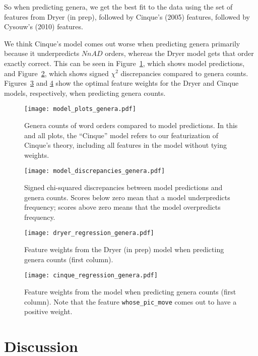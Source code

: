 \documentclass[11pt]{article}
\begin{document}
So when predicting genera, we get the best fit to the data using the set of features from Dryer (in prep), followed by Cinque's (2005) features, followed by Cysouw's (2010) features.

We think Cinque's model comes out worse when predicting genera primarily because it underpredicts $NnAD$ orders, whereas the Dryer model gets that order exactly correct. This can be seen in Figure~\ref{fig:genera-predictions}, which shows model predictions, and Figure~\ref{fig:genera-discrepancies}, which shows signed $\chi^2$ discrepancies compared to genera counts.
Figures~\ref{fig:dryer-model-genera} and \ref{fig:cinque-model-genera} show the optimal feature weights for the Dryer and Cinque models, respectively, when predicting genera counts.

\begin{figure}[ht!]
  \centering
  \texttt{[image: model\_plots\_genera.pdf]}
  \caption{Genera counts of word orders compared to model predictions. In this and all plots, the ``Cinque'' model refers to our featurization of Cinque's theory, including all features in the model without tying weights.}
  \label{fig:genera-predictions}
\end{figure}

\begin{figure}[ht!]
  \centering
  \texttt{[image: model\_discrepancies\_genera.pdf]}
  \caption{Signed chi-squared discrepancies between model predictions and genera counts. Scores below zero mean that a model underpredicts frequency; scores above zero means that the model overpredicts frequency.}
  \label{fig:genera-discrepancies}
\end{figure}

\begin{figure}[ht!]
  \centering
  \texttt{[image: dryer\_regression\_genera.pdf]}
  \caption{Feature weights from the Dryer (in prep) model when predicting genera counts (first column).}
  \label{fig:dryer-model-genera}
\end{figure}

\begin{figure}[ht!]
  \centering
  \texttt{[image: cinque\_regression\_genera.pdf]}
  \cprotect\caption{Feature weights from the \citet{cinque2005deriving} model when predicting genera counts (first column). Note that the feature \verb+whose_pic_move+ comes out to have a positive weight.}
  \label{fig:cinque-model-genera}
\end{figure}

\section{Discussion}
\end{document}
